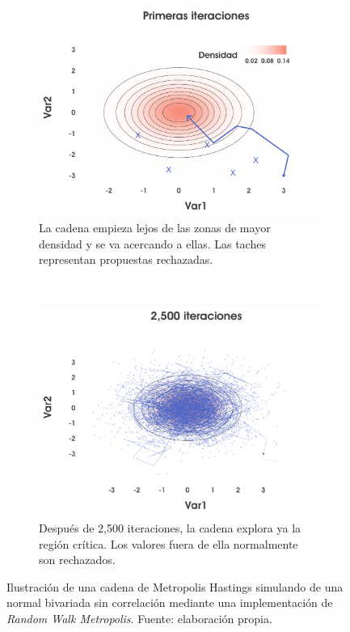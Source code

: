 \begin{figure}[h]
    \centering
    \begin{subfigure}{0.35\textwidth}
        \includegraphics[width=\textwidth]{Figs/Bayes/Ejemplo_RWM_A}
        \caption{La cadena empieza lejos de las zonas de mayor densidad y se va acercando a ellas. Las taches representan propuestas rechazadas.}
    \end{subfigure}
    ~ 
    \begin{subfigure}{0.35\textwidth}
        \includegraphics[width=\textwidth]{Figs/Bayes/Ejemplo_RWM_B}
        \caption{Después de 2,500 iteraciones, la cadena explora ya la región crítica. Los valores fuera de ella normalmente son rechazados.}
    \end{subfigure}
    \caption{Ilustración de una cadena de Metropolis Hastings simulando de una normal bivariada sin correlación mediante una implementación de \textit{Random Walk Metropolis}. Fuente: elaboración propia.}\label{fig:RWM}
\end{figure}

